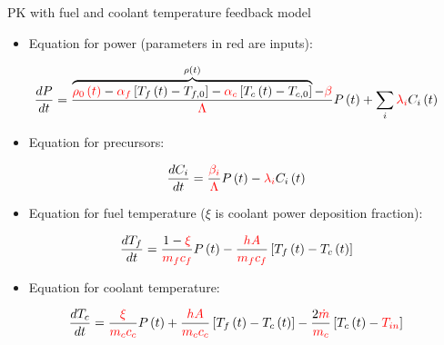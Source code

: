 \documentclass[serif]{beamer}
\begin{document}
\begin{frame}{PK with fuel and coolant temperature feedback model}
  \footnotesize
  \begin{itemize}
    \item Equation for power (parameters in {\color{red}red} are inputs):
  \end{itemize}
  \begin{equation}
    \nonumber
    \frac{dP}{dt} = \frac{\overbrace{{\color{red}\rho_0\left(t\right)} - {\color{red}\alpha_f}\left[T_f\left(t\right) - T_{f,0}\right] - {\color{red}\alpha_c}\left[T_c\left(t\right) - 
    T_{c,0}\right]}^{\rho\left(t\right)} - {\color{red}{\beta}}}{{\color{red}\Lambda}}P\left(t\right) + \sum_i{\color{red}\lambda_i}C_i\left(t\right)
  \end{equation}
    \begin{itemize}
    \item Equation for precursors:
  \end{itemize}
  \begin{equation}
    \nonumber
    \frac{dC_i}{dt} = \frac{{\color{red}\beta_i}}{{\color{red}\Lambda}}P\left(t\right) - {\color{red}\lambda_i}C_i\left(t\right)
  \end{equation}
    \begin{itemize}
    \item Equation for fuel temperature ($\xi$ is coolant power deposition fraction):
  \end{itemize}
  \begin{equation}
    \nonumber
    \frac{dT_f}{dt} = \frac{1-{\color{red}\xi}}{{\color{red}m_fc_f}}P\left(t\right) - \frac{\color{red}hA}{\color{red}m_fc_f}\left[T_f\left(t\right) - T_c\left(t\right)\right]
  \end{equation}
    \begin{itemize}
    \item Equation for coolant temperature:
  \end{itemize}
  \begin{equation}
    \nonumber
    \frac{dT_c}{dt} = \frac{{\color{red}\xi}}{{\color{red}m_cc_c}}P\left(t\right) + \frac{\color{red}hA}{\color{red}m_cc_c}\left[T_f\left(t\right) - T_c\left(t\right)\right]
    - \frac{2\color{red}\dot{m}}{\color{red}m_c}\left[T_c\left(t\right) - {\color{red}T_{in}}\right]
  \end{equation}
\end{frame}
\end{document}
